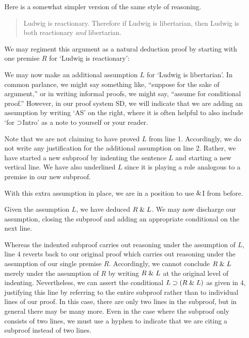 Here is a somewhat simpler version of the same style of reasoning.
	\begin{quote}
		Ludwig is reactionary. Therefore if Ludwig is libertarian, then Ludwig is both reactionary \emph{and} libertarian.
	\end{quote}
We may regiment this argument as a natural deduction proof by starting with one premise $R$ for `Ludwig is reactionary':
	\begin{fitchproof}
		 \pr{}
	\end{fitchproof}
We may now make an additional assumption $L$ for `Ludwig is libertarian'.
In common parlance, we might say something like, ``suppose for the sake of argument,'' or in writing informal proofs, we might say, ``assume for conditional proof.''
However, in our proof system SD, we will indicate that we are adding an assumption by writing `AS' on the right, where it is often helpful to also include `for $\supset$Intro' as a note to yourself or your reader.
	\begin{fitchproof}
		 \pr{}
		\open
			 \as{for \eif Intro}{}
	\end{fitchproof}

Note that we are not claiming to have proved $L$ from line 1.
Accordingly, we do not write any justification for the additional assumption on line 2.
Rather, we have started a new subproof by indenting the sentence $L$ and starting a new vertical line.
We have also underlined $L$ since it is playing a role analogous to a premise in our new subproof. 

With this extra assumption in place, we are in a position to use $\mathrel\&$I from before.
	\begin{fitchproof}
		 \pr{}
		\open
			 
			\ai{r, l}
	\end{fitchproof}
Given the assumption $L$, we have deduced $R \mathrel\& L$.
We may now discharge our assumption, closing the subproof and adding an appropriate conditional on the next line.
	\begin{fitchproof}
		 \pr{}
		\open
			 \as{for \eif Intro}{}
			\ai{r, l}
			\close
		\ci{l-rl}
	\end{fitchproof}
Whereas the indented subproof carries out reasoning under the assumption of $L$, line $4$ reverts back to our original proof which carries out reasoning under the assumption of our single premise $R$.
Accordingly, we cannot conclude $R\mathrel\& L$ merely under the assumption of $R$ by writing $R\mathrel\& L$ at the original level of indenting.
Nevertheless, we can assert the conditional $L\supset(R\mathrel\& L)$ as given in $4$, justifying this line by referring to the entire subproof rather than to individual lines of our proof.
In this case, there are only two lines in the subproof, but in general there may be many more.
Even in the case where the subproof only consists of two lines, we must use a hyphen to indicate that we are citing a subproof instead of two lines.

